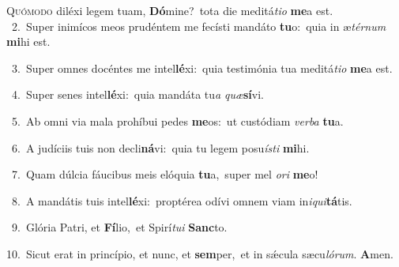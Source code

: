 \lettrine{\initial\textcolor{\initialcolor}{Q}}{uómodo} diléxi legem tuam, \textbf{Dó}\-mine?~\star tota die meditá\-\textit{ti}\-\textit{o} \textbf{me}\-a est.\\
{\numbfont\textcolor{\numbcolor}{~2.}}~Super inimícos meos prudéntem me fecísti mandáto \textbf{tu}\-o:~\star quia in æ\-\textit{tér}\-\textit{num} \textbf{mi}\-hi est.\par
{\numbfont\textcolor{\numbcolor}{~3.}}~Super omnes docéntes me intel\-\textbf{lé}\-xi:~\star quia testimónia tua meditá\-\textit{ti}\-\textit{o} \textbf{me}\-a est.\par
{\numbfont\textcolor{\numbcolor}{~4.}}~Super senes intel\-\textbf{lé}\-xi:~\star quia mandáta tu\textit{a} \textit{quæ}\-\textbf{sí}vi.\par
{\numbfont\textcolor{\numbcolor}{~5.}}~Ab omni via mala prohíbui pedes \textbf{me}\-os:~\star ut custódiam \textit{ver}\-\textit{ba} \textbf{tu}\-a.\par
{\numbfont\textcolor{\numbcolor}{~6.}}~A judíciis tuis non decli\-\textbf{ná}\-vi:~\star quia tu legem posu\-\textit{ís}\-\textit{ti} \textbf{mi}\-hi.\par
{\numbfont\textcolor{\numbcolor}{~7.}}~Quam dúlcia fáucibus meis elóquia \textbf{tu}\-a,~\star super mel \textit{o}\-\textit{ri} \textbf{me}\-o!\par
{\numbfont\textcolor{\numbcolor}{~8.}}~A mandátis tuis intel\-\textbf{lé}\-xi:~\star proptérea odívi omnem viam in\-\textit{i}\-\textit{qui}\textbf{tá}tis.\par
{\numbfont\textcolor{\numbcolor}{~9.}}~Glória Patri, et \textbf{Fí}\-lio,~\star et Spirí\-\textit{tu}\-\textit{i} \textbf{Sanc}\-to.\par
{\numbfont\textcolor{\numbcolor}{10.}}~Sicut erat in princípio, et nunc, et \textbf{sem}\-per,~\star et in sǽcula sæcu\-\textit{ló}\-\textit{rum}. \textbf{A}\-men.\par
